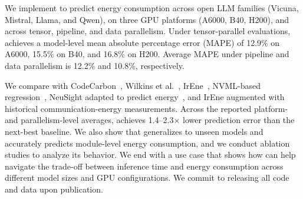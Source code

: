 We implement \sys{} to predict energy consumption across open LLM families
(Vicuna, Mistral, Llama, and Qwen), 
on three GPU platforms (A6000, B40, H200), and across
tensor, pipeline, and data
parallelism. %
Under tensor-parallel evaluations, \sys{} achieves a model-level mean absolute percentage error (MAPE) of 12.9\% on A6000, 15.5\% on B40, and 16.8\% on H200. Average MAPE under pipeline and data parallelism is 12.2\% and 10.8\%, respectively.

We compare \sys{} with CodeCarbon~\cite{codecarbon}, Wilkins et al.~\cite{wilkins2024offlineenergyoptimalllmserving}, IrEne~\cite{irene}, NVML-based regression~\cite{nvml}, NeuSight adapted to predict energy~\cite{neusight}, and IrEne augmented with historical communication-energy measurements. 
Across the reported platform- and parallelism-level averages, \sys{} achieves 1.4--2.3$\times$ lower prediction error than the next-best baseline.
We also show that \sys{} generalizes to unseen models and accurately predicts module-level energy consumption, and we conduct ablation studies to analyze its behavior.
We end with a use case that shows how \sys{} can help navigate the trade-off between inference time and energy consumption across different model sizes and GPU configurations. We commit to releasing all code and data upon publication.